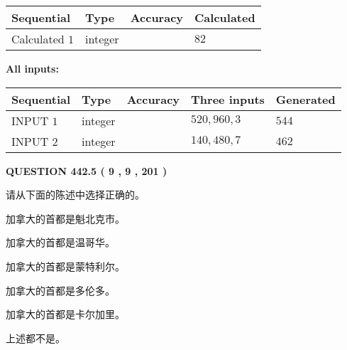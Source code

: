 \documentclass{ctexart}
\begin{document}
   
   
   
\noindent{}
   
   
  
  
\noindent\begin{tabular}{|l|l|l|l|}
\hline
 Sequential & Type & Accuracy & Calculated \\ 
\hline
 
 
  Calculated $  1 $ & integer &  & 
  $ 82 $ 
 \\  \hline  
 \end{tabular}
   
   
   
   
\noindent\vspace{0.1in}\hspace{-0.08in} {\textbf{\Large{All inputs: }}}
   
   
  
  
\noindent\begin{tabular}{|l|l|l|l|l|}
\hline
 Sequential & Type & Accuracy & Three inputs & Generated \\ 
\hline
 
 
  INPUT $  1 $ & integer &  & $
 520
 , 
 960
 , 
 3
 $ & $ 544 $ 
 \\  \hline  
 
 
  INPUT $  2 $ & integer &  & $
 140
 , 
 480
 , 
 7
 $ & $ 462 $ 
 \\  \hline  
 \end{tabular}
   
   
  
\vspace{0.2in}
  
{\textbf{\Large{QUESTION
442.5 
 ( 9 , 9 , 201 )
}}}
  
  
请从下面的陈述中选择正确的。
 
 
加拿大的首都是魁北克市。
 
 
加拿大的首都是温哥华。
 
 
加拿大的首都是蒙特利尔。
 
 
加拿大的首都是多伦多。
 
 
加拿大的首都是卡尔加里。
 
 
 上述都不是。
 
 
\noindent{}
 
\end{document}
